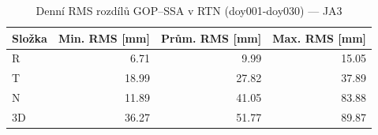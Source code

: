 \begin{table}[H]
\centering
\caption{Denní RMS rozdílů GOP–SSA v RTN (doy001-doy030) — JA3}
\label{tab:gop_vs_ssa_ja3_doy001-doy030_rms}
\begin{tabular}{lrrr}
\toprule
Složka & Min. RMS [mm] & Prům. RMS [mm] & Max. RMS [mm] \\
\midrule
R & 6.71 & 9.99 & 15.05 \\
T & 18.99 & 27.82 & 37.89 \\
N & 11.89 & 41.05 & 83.88 \\
3D & 36.27 & 51.77 & 89.87 \\
\bottomrule
\end{tabular}
\end{table}
